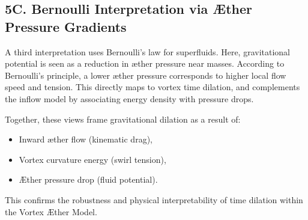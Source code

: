 \subsection*{5C. Bernoulli Interpretation via Æther Pressure Gradients}

A third interpretation uses Bernoulli's law for superfluids. Here, gravitational potential is seen as a reduction in æther pressure near masses. According to Bernoulli's principle, a lower æther pressure corresponds to higher local flow speed and tension. This directly maps to vortex time dilation, and complements the inflow model by associating energy density with pressure drops.

Together, these views frame gravitational dilation as a result of:
\begin{itemize}
    \item Inward æther flow (kinematic drag),
    \item Vortex curvature energy (swirl tension),
    \item Æther pressure drop (fluid potential).
\end{itemize}

This confirms the robustness and physical interpretability of time dilation within the Vortex Æther Model.
